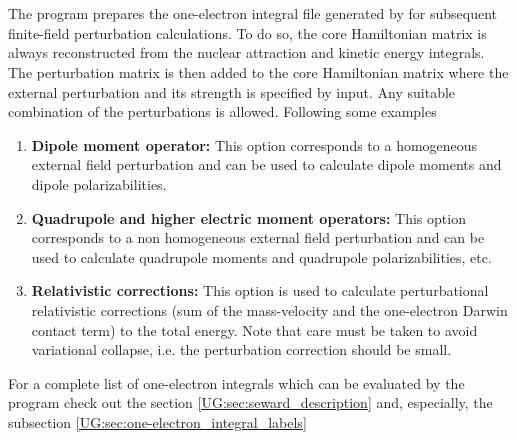 
\section{}
\label{UG:sec:ffpt}

The program
 prepares the one-{}electron integral file generated by
 for subsequent finite-{}field perturbation
calculations. To do so, the core Hamiltonian matrix is always
reconstructed from the nuclear attraction and kinetic energy integrals.
The perturbation matrix is then added to the core
Hamiltonian matrix where the external perturbation and its strength is
specified by input. Any suitable combination of the perturbations
is allowed. Following some examples
\begin{enumerate}
\itemsep 9pt plus 3pt minus 3pt
\item
{\bf Dipole moment operator:}
This option corresponds
to a homogeneous external field perturbation and can be used to
calculate dipole moments and dipole polarizabilities.
\item
{\bf Quadrupole and higher electric moment operators:}
This option
corresponds to a non homogeneous external field perturbation and can be
used to calculate quadrupole moments and quadrupole
polarizabilities, etc.
\item
{\bf Relativistic corrections:}
This option is used to
calculate perturbational relativistic corrections (sum of the mass-velocity
and the one-electron Darwin contact term) to the total energy. Note that care
must be taken to avoid variational collapse, i.e. the perturbation correction
should be small.
\end{enumerate}
For a complete list of one-electron integrals which can be
evaluated by the program  check out the section
\ref{UG:sec:seward_description} and, especially, the subsection
\ref{UG:sec:one-electron_integral_labels}


